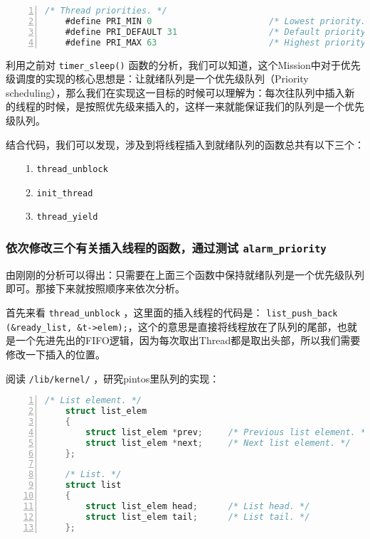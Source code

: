 \documentclass{article}
\begin{document}
	\begin{lstlisting}[xleftmargin = 4em,xrightmargin = 4em, aboveskip = 1em, numbers = left, language = C, title=\texttt{priority}约束]
    /* Thread priorities. */
    #define PRI_MIN 0                       /* Lowest priority. */
    #define PRI_DEFAULT 31                  /* Default priority. */
    #define PRI_MAX 63                      /* Highest priority. */
	\end{lstlisting}
	
	利用之前对 \texttt{timer\_sleep()} 函数的分析，我们可以知道，这个Mission中对于优先级调度的实现的核心思想是：让就绪队列是一个优先级队列（Priority scheduling），那么我们在实现这一目标的时候可以理解为：每次往队列中插入新的线程的时候，是按照优先级来插入的，这样一来就能保证我们的队列是一个优先级队列。
	
	结合代码，我们可以发现，涉及到将线程插入到就绪队列的函数总共有以下三个：
	
	~~~~1. \texttt{thread\_unblock}
	
	~~~~2. \texttt{init\_thread}
	
	~~~~3. \texttt{thread\_yield}
	
	\subsubsection{依次修改三个有关插入线程的函数，通过测试 \texttt{alarm\_priority} }
	
	由刚刚的分析可以得出：只需要在上面三个函数中保持就绪队列是一个优先级队列即可。那接下来就按照顺序来依次分析。
	
	首先来看 \texttt{thread\_unblock} ，这里面的插入线程的代码是： \texttt{list\_push\_back (\&ready\_list, \&t->elem);}，这个的意思是直接将线程放在了队列的尾部，也就是一个先进先出的FIFO逻辑，因为每次取出Thread都是取出头部，所以我们需要修改一下插入的位置。
	
	阅读 \texttt{/lib/kernel/} ，研究pintos里队列的实现：
	
	\begin{lstlisting}[xleftmargin = 4em,xrightmargin = 4em, aboveskip = 1em, numbers = left, language = C, title=\texttt{pintos}里的list]
    /* List element. */
    struct list_elem
    {
    	struct list_elem *prev;     /* Previous list element. */
    	struct list_elem *next;     /* Next list element. */
    };
    
    /* List. */
    struct list
    {
    	struct list_elem head;      /* List head. */
    	struct list_elem tail;      /* List tail. */
    };
	\end{lstlisting}
	
\end{document}
